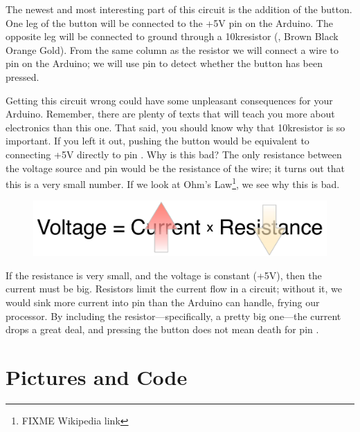 The newest and most interesting part of this circuit is the addition of the button. One leg of the button will be connected to the {\code +5V} pin on the Arduino. The opposite leg will be connected to ground through a 10k\ohm resistor (, Brown Black Orange Gold). From the same column as the resistor we will connect a wire to pin \pintwo on the Arduino; we will use pin \pintwo to detect whether the button has been pressed. 

Getting this circuit wrong could have some unpleasant consequences for your Arduino. Remember, there are plenty of texts that will teach you more about electronics than this one. That said, you should know why that 10k\ohm resistor is so important. If you left it out, pushing the button would be equivalent to connecting {\code +5V} directly to pin \pintwo. Why is this bad? The only resistance between the voltage source and pin \pintwo would be the resistance of the wire; it turns out that this is a very small number. If we look at Ohm's Law\footnote{FIXME Wikipedia link}, we see why this is bad.


\begin{figure}[ht]
  \begin{center}
    \includegraphics[width=0.8\linewidth]{images/ch4-ohms-law}
    \label{image:ohms-law}
  \end{center}
\end{figure}

If the resistance is very small, and the voltage is constant ({\code +5V}), then the current must be big. Resistors limit the current flow in a circuit; without it, we would sink more current into pin \pintwo than the Arduino can handle, frying our processor. By including the resistor---specifically, a pretty big one---the current drops a great deal, and pressing the button does not mean death for pin \pintwo.

\newpage

\section{Pictures and Code}

